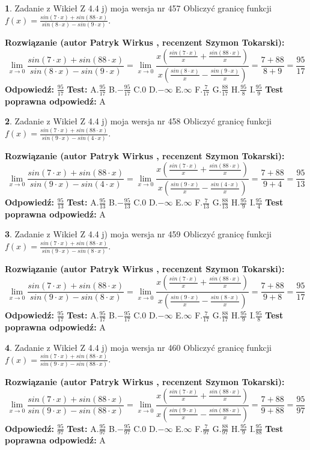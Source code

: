 \documentclass[12pt, a4paper]{article}
\theoremstyle{definition} %
\newtheorem{zad}{}
\newcommand{\zadStart}[1]{\begin{zad}#1\newline}
\newcommand{\zadStop}{\end{zad}}
\newcommand{\rozwStart}[2]{\noindent \textbf{Rozwiązanie (autor #1 , recenzent #2): }\newline}
\newcommand{\rozwStop}{\newline}
\newcommand{\odpStart}{\noindent \textbf{Odpowiedź:}\newline}
\newcommand{\odpStop}{\newline}
\newcommand{\testStart}{\noindent \textbf{Test:}\newline}
\newcommand{\testStop}{\newline}
\newcommand{\kluczStart}{\noindent \textbf{Test poprawna odpowiedź:}\newline}
\newcommand{\kluczStop}{\newline}
\begin{document}
\zadStart{Zadanie z Wikieł Z 4.4 j) moja wersja nr 457}
Obliczyć granicę funkcji $f(x)=\frac{sin(7\cdot x) +sin(88\cdot x)}{sin(8\cdot x) -sin(9\cdot x)}$.
\zadStop
\rozwStart{Patryk Wirkus}{Szymon Tokarski}
$$\lim\limits_{x\to 0}\frac{sin(7\cdot x) +sin(88\cdot x)}{sin(8\cdot x) -sin(9\cdot x)}=\lim\limits_{x\to 0}\frac{x(\frac{sin(7\cdot x)}{x}+\frac{sin(88\cdot x)}{x})}{x(\frac{sin(8\cdot x)}{x}-\frac{sin(9\cdot x)}{x})}=\frac{7+88}{8+9} = \frac{95}{17}$$
\rozwStop
\odpStart
$\frac{95}{17}$
\odpStop
\testStart
A.$\frac{95}{17}$
B.$-\frac{95}{17}$
C.$0$
D.$-\infty$
E.$\infty$
F.$\frac{7}{17}$
G.$\frac{88}{17}$
H.$\frac{95}{8}$
I.$\frac{95}{9}$
\testStop
\kluczStart
A
\kluczStop



\zadStart{Zadanie z Wikieł Z 4.4 j) moja wersja nr 458}
Obliczyć granicę funkcji $f(x)=\frac{sin(7\cdot x) +sin(88\cdot x)}{sin(9\cdot x) -sin(4\cdot x)}$.
\zadStop
\rozwStart{Patryk Wirkus}{Szymon Tokarski}
$$\lim\limits_{x\to 0}\frac{sin(7\cdot x) +sin(88\cdot x)}{sin(9\cdot x) -sin(4\cdot x)}=\lim\limits_{x\to 0}\frac{x(\frac{sin(7\cdot x)}{x}+\frac{sin(88\cdot x)}{x})}{x(\frac{sin(9\cdot x)}{x}-\frac{sin(4\cdot x)}{x})}=\frac{7+88}{9+4} = \frac{95}{13}$$
\rozwStop
\odpStart
$\frac{95}{13}$
\odpStop
\testStart
A.$\frac{95}{13}$
B.$-\frac{95}{13}$
C.$0$
D.$-\infty$
E.$\infty$
F.$\frac{7}{13}$
G.$\frac{88}{13}$
H.$\frac{95}{9}$
I.$\frac{95}{4}$
\testStop
\kluczStart
A
\kluczStop



\zadStart{Zadanie z Wikieł Z 4.4 j) moja wersja nr 459}
Obliczyć granicę funkcji $f(x)=\frac{sin(7\cdot x) +sin(88\cdot x)}{sin(9\cdot x) -sin(8\cdot x)}$.
\zadStop
\rozwStart{Patryk Wirkus}{Szymon Tokarski}
$$\lim\limits_{x\to 0}\frac{sin(7\cdot x) +sin(88\cdot x)}{sin(9\cdot x) -sin(8\cdot x)}=\lim\limits_{x\to 0}\frac{x(\frac{sin(7\cdot x)}{x}+\frac{sin(88\cdot x)}{x})}{x(\frac{sin(9\cdot x)}{x}-\frac{sin(8\cdot x)}{x})}=\frac{7+88}{9+8} = \frac{95}{17}$$
\rozwStop
\odpStart
$\frac{95}{17}$
\odpStop
\testStart
A.$\frac{95}{17}$
B.$-\frac{95}{17}$
C.$0$
D.$-\infty$
E.$\infty$
F.$\frac{7}{17}$
G.$\frac{88}{17}$
H.$\frac{95}{9}$
I.$\frac{95}{8}$
\testStop
\kluczStart
A
\kluczStop



\zadStart{Zadanie z Wikieł Z 4.4 j) moja wersja nr 460}
Obliczyć granicę funkcji $f(x)=\frac{sin(7\cdot x) +sin(88\cdot x)}{sin(9\cdot x) -sin(88\cdot x)}$.
\zadStop
\rozwStart{Patryk Wirkus}{Szymon Tokarski}
$$\lim\limits_{x\to 0}\frac{sin(7\cdot x) +sin(88\cdot x)}{sin(9\cdot x) -sin(88\cdot x)}=\lim\limits_{x\to 0}\frac{x(\frac{sin(7\cdot x)}{x}+\frac{sin(88\cdot x)}{x})}{x(\frac{sin(9\cdot x)}{x}-\frac{sin(88\cdot x)}{x})}=\frac{7+88}{9+88} = \frac{95}{97}$$
\rozwStop
\odpStart
$\frac{95}{97}$
\odpStop
\testStart
A.$\frac{95}{97}$
B.$-\frac{95}{97}$
C.$0$
D.$-\infty$
E.$\infty$
F.$\frac{7}{97}$
G.$\frac{88}{97}$
H.$\frac{95}{9}$
I.$\frac{95}{88}$
\testStop
\kluczStart
A
\kluczStop
\end{document}
